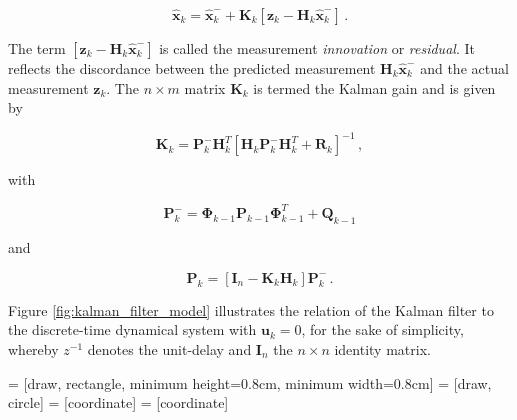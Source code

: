 \begin{equation}\label{eq:aposteriori_estimate}
  \hat{\bm{x}}_k = \hat{\bm{x}}^-_k + \bm{K}_{k}[\bm{z}_k-\bm{H}_{k}\hat{\bm{x}}^-_k]\,.
\end{equation}

\noindent
The term $[\bm{z}_k-\bm{H}_{k}\hat{\bm{x}}^-_k]$ is called the measurement \emph{innovation} or \emph{residual}. It reflects the discordance between the predicted measurement $\bm{H}_{k}\hat{\bm{x}}^-_k$ and the actual measurement $\bm{z}_k$. The $n\times m$ matrix $\bm{K}_{k}$ is termed the Kalman gain and is given by

\begin{equation}\label{eq:Kalman_gain}
  \bm{K}_{k} = \bm{P}^-_k \bm{H}^T_k[\bm{H}_k \bm{P}^-_k \bm{H}^T_k + \bm{R}_k]^{-1}\,,
\end{equation}

\noindent
with

\begin{equation}\label{eq:apriori_error_cov}
  \bm{P}^-_{k} = \bm{\Phi}_{k-1} \bm{P}_{k-1} \bm{\Phi}^T_{k-1} + \bm{Q}_{k-1}
\end{equation}

\noindent
and

\begin{equation}\label{eq:aposteriori_error_cov}
  \bm{P}_{k} = [\bm{I}_n - \bm{K}_{k}\bm{H}_{k}]\bm{P}^-_{k}\,.
\end{equation}

\noindent
Figure \ref{fig:kalman_filter_model} illustrates the relation of the Kalman filter to the discrete-time dynamical system with $\bm{u}_{k}=0$, for the sake of simplicity, whereby $z^{-1}$ denotes the unit-delay and $\bm{I}_n$ the $n\times n$ identity matrix.

 = [draw, rectangle, minimum height=0.8cm, minimum width=0.8cm]
 = [draw, circle]
 = [coordinate]
 = [coordinate]

